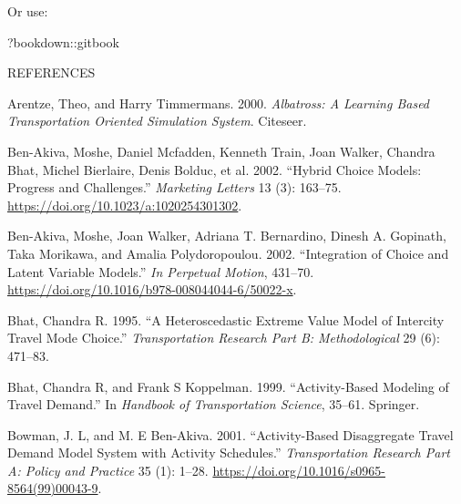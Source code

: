 \documentclass[12pt, oneside, openright]{byuthesis}
\newlength{\cslhangindent}
\newlength{\cslentryspacingunit} %
\newenvironment{CSLReferences}[2] %
 {%
  \setlength{\parindent}{0pt}
  \ifodd #1
  \let\oldpar\par
  \def\par{\hangindent=\cslhangindent\oldpar}
  \fi
  \setlength{\parskip}{#2\cslentryspacingunit}
 }%
 {}
\newenvironment{Shaded}{\begin{snugshade}}{\end{snugshade}}
\newcommand{\NormalTok}[1]{#1}
\newcommand{\SpecialCharTok}[1]{\textcolor[rgb]{0.00,0.00,0.00}{#1}}
\begin{document}
Or use:

\begin{Shaded}
\begin{Highlighting}[]
\NormalTok{?bookdown}\SpecialCharTok{::}\NormalTok{gitbook}
\end{Highlighting}
\end{Shaded}

\cleardoublepage
    \begin{centering}
    REFERENCES\\
     \baselineskip
    \end{centering}

\hypertarget{refs}{}
\begin{CSLReferences}{1}{0}
\leavevmode{}%
Arentze, Theo, and Harry Timmermans. 2000. \emph{Albatross: A Learning Based Transportation Oriented Simulation System}. Citeseer.

\leavevmode{}%
Ben-Akiva, Moshe, Daniel Mcfadden, Kenneth Train, Joan Walker, Chandra Bhat, Michel Bierlaire, Denis Bolduc, et al. 2002. {``Hybrid Choice Models: Progress and Challenges.''} \emph{Marketing Letters} 13 (3): 163--75. \url{https://doi.org/10.1023/a:1020254301302}.

\leavevmode{}%
Ben-Akiva, Moshe, Joan Walker, Adriana T. Bernardino, Dinesh A. Gopinath, Taka Morikawa, and Amalia Polydoropoulou. 2002. {``Integration of Choice and Latent Variable Models.''} \emph{In Perpetual Motion}, 431--70. \url{https://doi.org/10.1016/b978-008044044-6/50022-x}.

\leavevmode{}%
Bhat, Chandra R. 1995. {``A Heteroscedastic Extreme Value Model of Intercity Travel Mode Choice.''} \emph{Transportation Research Part B: Methodological} 29 (6): 471--83.

\leavevmode{}%
Bhat, Chandra R, and Frank S Koppelman. 1999. {``Activity-Based Modeling of Travel Demand.''} In \emph{Handbook of Transportation Science}, 35--61. Springer.

\leavevmode{}%
Bowman, J. L, and M. E Ben-Akiva. 2001. {``Activity-Based Disaggregate Travel Demand Model System with Activity Schedules.''} \emph{Transportation Research Part A: Policy and Practice} 35 (1): 1--28. \url{https://doi.org/10.1016/s0965-8564(99)00043-9}.


\end{CSLReferences}
\end{document}
